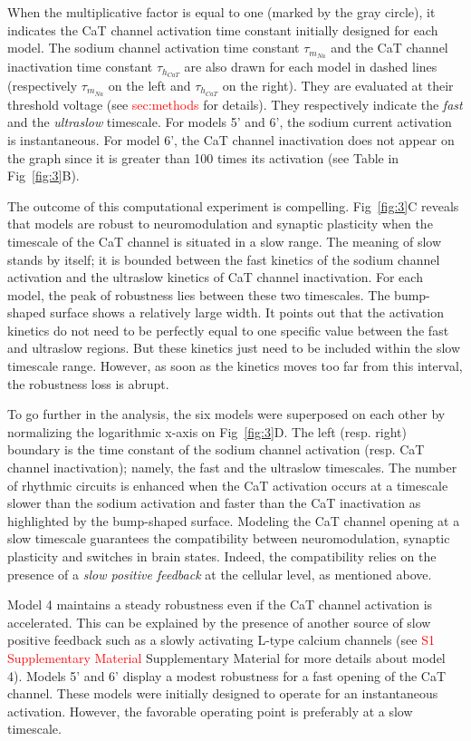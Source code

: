 When the multiplicative factor is equal to one (marked by the gray circle), it indicates the CaT channel activation time constant initially designed for each model. The sodium channel activation time constant $\tau_{m_{Na}}$ and the CaT channel inactivation time constant $\tau_{h_{CaT}}$ are also drawn for each model in dashed lines (respectively $\tau_{m_{Na}}$ on the left and $\tau_{h_{CaT}}$ on the right). They are evaluated at their threshold voltage (see \textcolor{red}{sec:methods} for details). They respectively indicate the \textit{fast} and the \textit{ultraslow} timescale. For models 5' and 6', the sodium current activation is instantaneous.  For model 6',  the CaT channel inactivation does not appear on the graph since it is greater than 100 times its activation (see Table in Fig~\ref{fig:3}B).

The outcome of this computational experiment is compelling. Fig~\ref{fig:3}C reveals that models are robust to neuromodulation and synaptic plasticity when the timescale of the CaT channel is situated in a slow range. The meaning of slow stands by itself; it is bounded  between the fast kinetics of the sodium channel activation and the ultraslow kinetics of CaT channel inactivation. For each model, the peak of robustness lies between these two timescales. The bump-shaped surface shows a relatively large width. It points out that the activation kinetics do not need to be perfectly equal to one specific value between the fast and ultraslow regions. But these kinetics just need to be included within the slow timescale range. However, as soon as the kinetics moves too far from this interval, the robustness loss is abrupt.

To go further in the analysis, the six models were superposed on each other by normalizing the logarithmic x-axis on Fig~\ref{fig:3}D. The left (resp. right) boundary is the time constant of the sodium channel activation (resp. CaT channel inactivation); namely, the fast and the ultraslow timescales.  The number of rhythmic circuits is enhanced when the CaT activation occurs at a timescale slower than the sodium activation and faster than the CaT inactivation as highlighted by the bump-shaped surface. Modeling the CaT channel opening at a slow timescale guarantees the compatibility between neuromodulation, synaptic plasticity and switches in brain states. Indeed, the compatibility relies on the presence of a \textit{slow positive feedback} at the cellular level, as mentioned above. 


Model 4 maintains a steady robustness even if the CaT channel activation is accelerated. This can be explained by the presence of another source of slow positive feedback such as a slowly activating L-type calcium channels (see \textcolor{red}{S1 Supplementary Material} Supplementary Material for more details about model 4). Models 5' and 6' display a modest robustness for a fast opening of the CaT channel. These models were initially designed to operate for an instantaneous activation. However, the favorable operating point is preferably at a slow timescale. 

